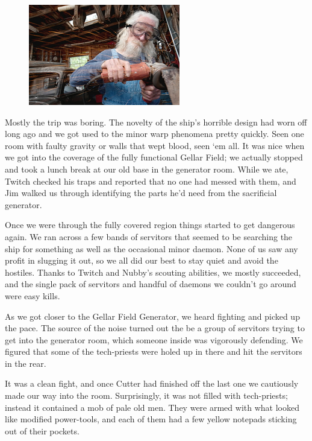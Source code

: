 \begin{figure}
	\begin{center}
		\includegraphics[width=\figwidth]{pics/7/27.png}
	\end{center}
\end{figure}
Mostly the trip was boring. 
The novelty of the ship’s horrible design had worn off long ago and we got used to the minor warp phenomena pretty quickly. 
Seen one room with faulty gravity or walls that wept blood, seen ‘em all. 
It was nice when we got into the coverage of the fully functional Gellar Field; 
we actually stopped and took a lunch break at our old base in the generator room. 
While we ate, Twitch checked his traps and reported that no one had messed with them, and Jim walked us through identifying the parts he’d need from the sacrificial generator.

Once we were through the fully covered region things started to get dangerous again. 
We ran across a few bands of servitors that seemed to be searching the ship for something as well as the occasional minor daemon. 
None of us saw any profit in slugging it out, so we all did our best to stay quiet and avoid the hostiles. 
Thanks to Twitch and Nubby’s scouting abilities, we mostly succeeded, and the single pack of servitors and handful of daemons we couldn’t go around were easy kills. 


As we got closer to the Gellar Field Generator, we heard fighting and picked up the pace. 
The source of the noise turned out the be a group of servitors trying to get into the generator room, which someone inside was vigorously defending. 
We figured that some of the tech-priests were holed up in there and hit the servitors in the rear. 


It was a clean fight, and once Cutter had finished off the last one we cautiously made our way into the room. 
Surprisingly, it was not filled with tech-priests; 
instead it contained a mob of pale old men. 
They were armed with what looked like modified power-tools, and each of them had a few yellow notepads sticking out of their pockets.

